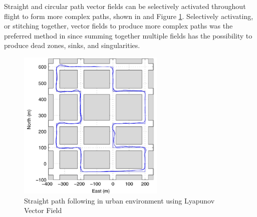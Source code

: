 \documentclass[numbered,pdftex]{ohio-etd}
\begin{document}


%
%

Straight and circular path vector fields can be selectively activated throughout flight to form more complex paths, shown in \cite{nelson_cooperative_2005,nelson_vector_2006,nelson_vector_2007,jung_unmanned_2016} and Figure \ref{fig:urbanfollowingnelson}. Selectively activating, or stitching together, vector fields to produce more complex paths was the preferred method in \cite{nelson_cooperative_2005} since summing together multiple fields has the possibility to produce dead zones, sinks, and singularities.
 

\begin{figure}[H]
	\centering
	\includegraphics[width=7cm]{PaperFigures/urbanFollowingNelson}
	\caption{Straight path following in urban environment \cite{nelson_cooperative_2005} using Lyapunov Vector Field}
	\label{fig:urbanfollowingnelson}
\end{figure}
\end{document}
